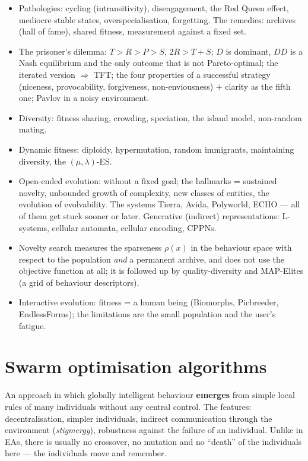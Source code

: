 \documentclass[11pt,a4paper]{article}
\theoremstyle{definition}
\providecommand{\uv}[1]{``#1''}
\begin{document}
\begin{itemize}
  \emph{Cooperative}: decomposition into components, CCGA,
  modules $+$ blueprints.
\item Pathologies: cycling (intransitivity), disengagement, the Red Queen
  effect, mediocre stable states, overspecialisation, forgetting.
  The remedies: archives (hall of fame), shared fitness, measurement against a
  fixed set.
\item The prisoner's dilemma: $T>R>P>S$, $2R > T+S$; $D$ is dominant, $DD$ is a
  Nash equilibrium and the only outcome that is not Pareto-optimal; the iterated
  version $\Rightarrow$ TFT; the four properties of a successful strategy
  (niceness, provocability, forgiveness, non-enviousness) $+$ clarity as the
  fifth one; Pavlov in a noisy environment.
\item Diversity: fitness sharing, crowding, speciation, the island model,
  non-random mating.
\item Dynamic fitness: diploidy, hypermutation, random immigrants, maintaining
  diversity, the $(\mu,\lambda)$-ES.
\item Open-ended evolution: without a fixed goal; the hallmarks = sustained
  novelty, unbounded growth of complexity, new classes of entities, the
  evolution of evolvability. The systems Tierra, Avida, Polyworld, ECHO --- all
  of them get stuck sooner or later.
  Generative (indirect) representations: L-systems, cellular automata, cellular
  encoding, CPPNs.
\item Novelty search measures the sparseness $\rho(x)$ in the behaviour space
  with respect to the population \emph{and} a permanent archive, and does not
  use the objective function at all; it is followed up by quality-diversity and
  MAP-Elites (a grid of behaviour descriptors).
\item Interactive evolution: fitness = a human being (Biomorphs, Picbreeder,
  EndlessForms); the limitations are the small population and the user's
  fatigue.
\end{itemize}

\section{Swarm optimisation algorithms}
\label{sec:roje}

\begin{defbox}
An approach in which globally intelligent behaviour \textbf{emerges} from simple
local rules of many individuals without any central control. The features:
decentralisation, simpler individuals, indirect communication through the
environment (\emph{stigmergy}), robustness against the failure of an individual.
Unlike in EAs, there is usually no crossover, no mutation and no \uv{death} of
the individuals here --- the individuals move and remember.
\end{defbox}
\end{document}

